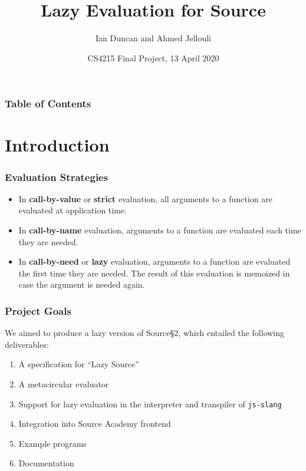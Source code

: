 \documentclass[12pt]{beamer}
\begin{document}
\newcommand{\mathsc}[1]{{\normalfont\textsc{#1}}}
\author{Ian Duncan and Ahmed Jellouli}
\title{Lazy Evaluation for Source}
\date{CS4215 Final Project, 13 April 2020}
\begin{frame}[plain]
	\maketitle
\end{frame}

\begin{frame}
\frametitle{Table of Contents}
\tableofcontents
\end{frame}

\section{Introduction}

\begin{frame}
\frametitle{Evaluation Strategies}
\begin{itemize}
\item<1->In \textbf{call-by-value} or \textbf{strict} evaluation, all arguments to a function are evaluated at application time.

\item<2->In \textbf{call-by-name} evaluation, arguments to a function are evaluated each time they are needed.

\item<3->In \textbf{call-by-need} or \textbf{lazy} evaluation, arguments to a function are evaluated the first time they are needed. The result of this evaluation is memoized in case the argument is needed again.
\end{itemize}
\end{frame}

\begin{frame}
\frametitle{Project Goals}
We aimed to produce a lazy version of Source\S2, which entailed the following deliverables:\pause
\begin{enumerate}
\item<2->A specification for ``Lazy Source'' 
\item<3->A metacircular evaluator
\item<4->Support for lazy evaluation in the interpreter and transpiler of \texttt{js-slang}
\item<5->Integration into Source Academy frontend
\item<5->Example programs
\item<7->Documentation
\end{enumerate}
\end{frame}
\end{document}
